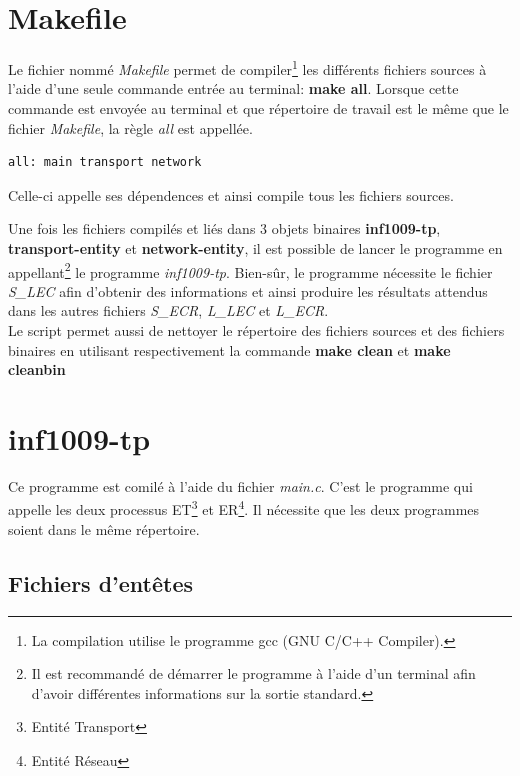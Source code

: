 \documentclass[11pt,french]{article}
\begin{document}
    \section{Makefile} %
    \label{sec:makefile}
        Le fichier nommé \emph{Makefile} permet de compiler\footnote{La compilation utilise le programme
        gcc (GNU C/C++ Compiler).} les différents fichiers sources
        à l'aide d'une seule commande entrée au terminal: {\bf make all}. Lorsque cette commande
        est envoyée au terminal et que répertoire de travail est le même que le fichier \emph{Makefile},
        la règle \emph{all} est appellée.
        \lstset{language=make}
        \begin{lstlisting}
all: main transport network
        \end{lstlisting}
        Celle-ci appelle ses dépendences et ainsi compile tous les 
        fichiers sources.

        Une fois les fichiers compilés et liés dans 3 objets binaires
        {\bf inf1009-tp}, {\bf transport-entity} et {\bf network-entity},
        il est possible de lancer le programme en appellant\footnote{Il est recommandé de
        démarrer le programme à l'aide d'un terminal afin d'avoir différentes informations sur
        la sortie standard.} le programme \emph{inf1009-tp}.
        Bien-sûr, le programme nécessite le fichier \emph{S\_LEC} afin d'obtenir des informations et
        ainsi produire les résultats attendus dans les autres fichiers \emph{S\_ECR}, \emph{L\_LEC}
        et \emph{L\_ECR}.\\

        Le script permet aussi de nettoyer le répertoire des fichiers sources et des fichiers binaires
        en utilisant respectivement la commande {\bf make clean} et {\bf make cleanbin}
    
    \section{inf1009-tp} %
    \label{sec:inf1009-tp}
        \lstset{language=c}
        Ce programme est comilé à l'aide du fichier \emph{main.c}. C'est le programme qui appelle
        les deux processus ET\footnote{Entité Transport} et ER\footnote{Entité Réseau}. Il nécessite
        que les deux programmes soient dans le même répertoire.
        
        \subsection{Fichiers d'entêtes} %
        \label{sub:fich-entete}
            
\end{document}
